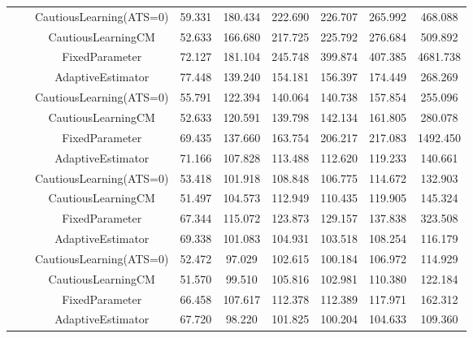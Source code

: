 \begin{table}[!h]
\begin{tabular}[t]{ccccccccc}
 &  & CautiousLearning(ATS=0) & 59.331 & 180.434 & 222.690 & 226.707 & 265.992 & 468.088\\

 &  & CautiousLearningCM & 52.633 & 166.680 & 217.725 & 225.792 & 276.684 & 509.892\\

 & \multirow[t]{-4}{*}{\centering\arraybackslash 0.35} & FixedParameter & 72.127 & 181.104 & 245.748 & 399.874 & 407.385 & 4681.738\\
\cmidrule{2-9}
 &  & AdaptiveEstimator & 77.448 & 139.240 & 154.181 & 156.397 & 174.449 & 268.269\\

 &  & CautiousLearning(ATS=0) & 55.791 & 122.394 & 140.064 & 140.738 & 157.854 & 255.096\\

 &  & CautiousLearningCM & 52.633 & 120.591 & 139.798 & 142.134 & 161.805 & 280.078\\

 & \multirow[t]{-4}{*}{\centering\arraybackslash 0.50} & FixedParameter & 69.435 & 137.660 & 163.754 & 206.217 & 217.083 & 1492.450\\
\cmidrule{2-9}
 &  & AdaptiveEstimator & 71.166 & 107.828 & 113.488 & 112.620 & 119.233 & 140.661\\

 &  & CautiousLearning(ATS=0) & 53.418 & 101.918 & 108.848 & 106.775 & 114.672 & 132.903\\

 &  & CautiousLearningCM & 51.497 & 104.573 & 112.949 & 110.435 & 119.905 & 145.324\\

 & \multirow[t]{-4}{*}{\centering\arraybackslash 0.75} & FixedParameter & 67.344 & 115.072 & 123.873 & 129.157 & 137.838 & 323.508\\
\cmidrule{2-9}
 &  & AdaptiveEstimator & 69.338 & 101.083 & 104.931 & 103.518 & 108.254 & 116.179\\

 &  & CautiousLearning(ATS=0) & 52.472 & 97.029 & 102.615 & 100.184 & 106.972 & 114.929\\

 &  & CautiousLearningCM & 51.570 & 99.510 & 105.816 & 102.981 & 110.380 & 122.184\\

 & \multirow[t]{-4}{*}{\centering\arraybackslash 1.00} & FixedParameter & 66.458 & 107.617 & 112.378 & 112.389 & 117.971 & 162.312\\
\cmidrule{2-9}
 &  & AdaptiveEstimator & 67.720 & 98.220 & 101.825 & 100.204 & 104.633 & 109.360\\


\end{tabular}
\end{table}
